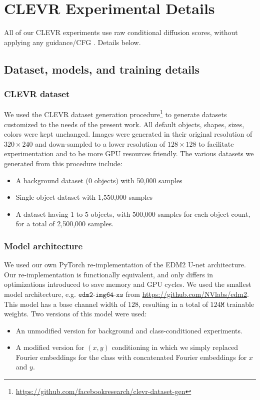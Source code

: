 \section{CLEVR Experimental Details}
\label{app:clevr_extra}

All of our CLEVR experiments use raw conditional diffusion
scores, without applying any guidance/CFG \citep{ho2022classifier}.
Details below.

\subsection{Dataset, models, and training details}
\subsubsection{CLEVR dataset}
We used the CLEVR \cite{johnson2017clevr} dataset generation procedure\footnote{\url{https://github.com/facebookresearch/clevr-dataset-gen}} to generate datasets customized to the needs of the present work.
All default objects, shapes, sizes, colors were kept unchanged.
Images were generated in their original resolution of $320\times240$ and down-sampled to a lower resolution of $128\times128$ to facilitate experimentation and to be more GPU resources friendly.
The various datasets we generated from this procedure include:
\begin{itemize}
    \item A background dataset ($0$ objects) with 50,000 samples
    \item Single object dataset with 1,550,000 samples
    \item A dataset having 1 to 5 objects, with 500,000 samples for each object count, for a total of 2,500,000 samples.
\end{itemize}

\subsubsection{Model architecture}
We used our own PyTorch re-implementation of the EDM2 \cite{karras2024analyzing} U-net architecture.
Our re-implementation is functionally equivalent, and only differs in optimizations introduced to save memory and GPU cycles.
We used the smallest model architecture, e.g. $\texttt{edm2-img64-xs}$ from \url{https://github.com/NVlabs/edm2}.
This model has a base channel width of $128$, resulting in a total of $124\texttt{M}$ trainable weights.
Two versions of this model were used:
\begin{itemize}
    \item An unmodified version for background and class-conditioned experiments.
    \item A modified version for $(x,y)$ conditioning in which we simply replaced Fourier embeddings for the class with concatenated Fourier embeddings for $x$ and $y$.
\end{itemize}

